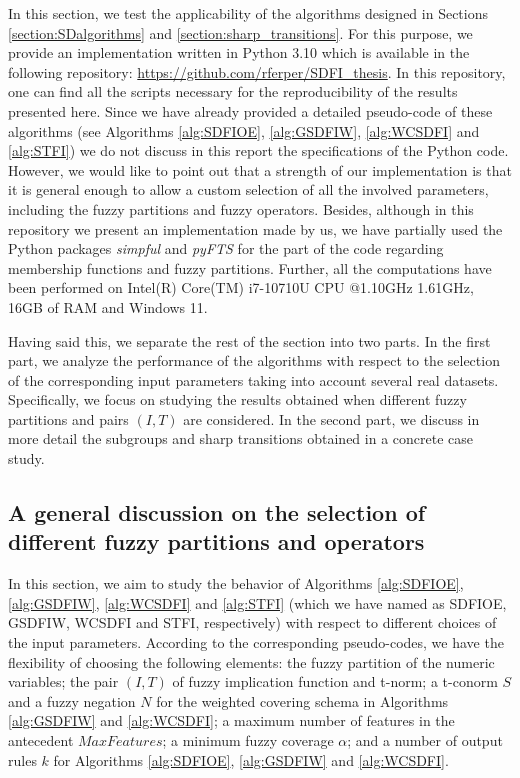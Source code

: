 In this section, we test the applicability of the algorithms designed in Sections \ref{section:SDalgorithms} and \ref{section:sharp_transitions}. For this purpose, we provide an implementation written in Python 3.10 which is available in the following repository: \url{https://github.com/rferper/SDFI_thesis}. In this repository, one can find all the scripts necessary for the reproducibility of the results presented here. Since we have already provided a detailed pseudo-code of these algorithms (see Algorithms \ref{alg:SDFIOE}, \ref{alg:GSDFIW}, \ref{alg:WCSDFI} and \ref{alg:STFI}) we do not discuss in this report the specifications of the Python code. However, we would like to point out that a strength of our implementation is that it is general enough to allow a custom selection of all the involved parameters, including the fuzzy partitions and fuzzy operators. Besides, although in this repository we present an implementation made by us, we have partially used the Python packages \textit{simpful} \cite{Spolaor2020} and \textit{pyFTS} \cite{Petronio2019} for the part of the code regarding membership functions and fuzzy partitions. Further, all the computations have been performed on Intel(R) Core(TM) i7-10710U CPU @1.10GHz 1.61GHz, 16GB of RAM and Windows 11.

Having said this, we separate the rest of the section into two parts. In the first part, we analyze the performance of the algorithms with respect to the selection of the corresponding input parameters taking into account several real datasets. Specifically, we focus on studying the results obtained when different fuzzy partitions and pairs $(I,T)$ are considered. In the second part, we discuss in more detail the subgroups and sharp transitions obtained in a concrete case study.

\subsection{A general discussion on the selection of different fuzzy partitions and operators}\label{subsection:SD:general_study}
In this section, we aim to study the behavior of Algorithms \ref{alg:SDFIOE}, \ref{alg:GSDFIW}, \ref{alg:WCSDFI} and \ref{alg:STFI} (which we have named as SDFIOE, GSDFIW, WCSDFI and STFI, respectively) with respect to different choices of the input parameters. According to the corresponding pseudo-codes, we have the flexibility of choosing the following elements: the fuzzy partition of the numeric variables; the pair $(I,T)$ of fuzzy implication function and t-norm; a t-conorm $S$ and a fuzzy negation $N$ for the weighted covering schema in Algorithms \ref{alg:GSDFIW} and \ref{alg:WCSDFI}; a maximum number of features in the antecedent $MaxFeatures$; a minimum fuzzy coverage $\alpha$; and a number of output rules $k$ for Algorithms \ref{alg:SDFIOE}, \ref{alg:GSDFIW} and \ref{alg:WCSDFI}.

